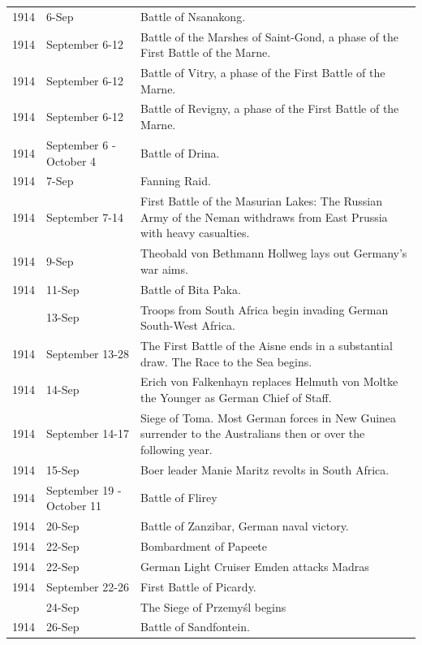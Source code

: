 \documentclass[
  openany]{book}
\begin{document}
\begin{longtable}[t]{rl>{\raggedright\arraybackslash}p{22em}}
\rowcolor{gray!6}  1914 & 6-Sep & Battle of Nsanakong.\\
1914 & September 6-12 & Battle of the Marshes of Saint-Gond, a phase of the First Battle of the Marne.\\
\rowcolor{gray!6}  1914 & September 6-12 & Battle of Vitry, a phase of the First Battle of the Marne.\\
1914 & September 6-12 & Battle of Revigny, a phase of the First Battle of the Marne.\\
\addlinespace
\rowcolor{gray!6}  1914 & September 6 - October 4 & Battle of Drina.\\
1914 & 7-Sep & Fanning Raid.\\
\rowcolor{gray!6}  1914 & September 7-14 & First Battle of the Masurian Lakes: The Russian Army of the Neman withdraws from East Prussia with heavy casualties.\\
1914 & 9-Sep & Theobald von Bethmann Hollweg lays out Germany's war aims.\\
\rowcolor{gray!6}  1914 & 11-Sep & Battle of Bita Paka.\\
\addlinespace
1914 & 13-Sep & Troops from South Africa begin invading German South-West Africa.\\
\rowcolor{gray!6}  1914 & September 13-28 & The First Battle of the Aisne ends in a substantial draw. The Race to the Sea begins.\\
1914 & 14-Sep & Erich von Falkenhayn replaces Helmuth von Moltke the Younger as German Chief of Staff.\\
\rowcolor{gray!6}  1914 & September 14-17 & Siege of Toma. Most German forces in New Guinea surrender to the Australians then or over the following year.\\
1914 & 15-Sep & Boer leader Manie Maritz revolts in South Africa.\\
\addlinespace
\rowcolor{gray!6}  1914 & September 19 - October 11 & Battle of Flirey\\
1914 & 20-Sep & Battle of Zanzibar, German naval victory.\\
\rowcolor{gray!6}  1914 & 22-Sep & Bombardment of Papeete\\
1914 & 22-Sep & German Light Cruiser Emden attacks Madras\\
\rowcolor{gray!6}  1914 & September 22-26 & First Battle of Picardy.\\
\addlinespace
1914 & 24-Sep & The Siege of Przemyśl begins\\
\rowcolor{gray!6}  1914 & 26-Sep & Battle of Sandfontein.\\

\end{longtable}
\end{document}
